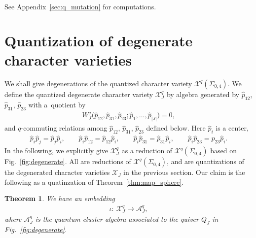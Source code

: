 \documentclass[pdftex]{sigma}
\numberwithin{equation}{section}
\newtheorem{Theorem}{Theorem}[section]
\begin{document}
See Appendix~\ref{sec:q_mutation} for computations.

\section{Quantization of degenerate character varieties}\label{sec:q_confluence}
We shall give degenerations of the quantized character variety $\mathcal{X}^q(\Sigma_{0,4})$. We define the quantized degenerate character variety $\mathcal{X}^q_J$ by algebra generated by $\hat{p}_{12}$, $\hat{p}_{31}$, $\hat{p}_{23}$ with a~quotient by
\begin{gather*} %
 W^q_J\big(\hat{p}_{12},\hat{p}_{31},\hat{p}_{23}; \hat{p}_1, \dots, \hat{p}_{|J|} \big) =0 ,
\end{gather*}
and $q$-commuting relations among $\hat{p}_{12}$, $\hat{p}_{31}$, $\hat{p}_{23}$ defined below. Here $\hat{p}_i$ is a center,
\begin{gather*} %
 \hat{p}_i \hat{p}_j = \hat{p}_j \hat{p}_i, \qquad \hat{p}_i \hat{p}_{12} = \hat{p}_{12} \hat{p}_{i} , \qquad \hat{p}_i \hat{p}_{31} = \hat{p}_{31} \hat{p}_{i} , \qquad \hat{p}_i \hat{p}_{23} = \hat{p}_{23} \hat{p}_{i} .
\end{gather*}
In the following, we explicitly give $\mathcal{X}^q_J$ as a reduction of $\mathcal{X}^q(\Sigma_{0,4})$ based on Fig.~\ref{fig:degenerate}. All are reductions of $\mathcal{X}^q(\Sigma_{0,4})$, and are quantizations of the degenerated character varieties $\mathcal{X}_J$ in the previous section. Our claim is the following as a quatinzation of Theorem~\ref{thm:map_sphere}.

\begin{Theorem} \label{thm:q_sphere} We have an embedding
 \begin{gather*}
 \iota\colon \ \mathcal{X}^q_J \to \mathcal{A}^q_J,
 \end{gather*}
 where $\mathcal{A}^q_J$ is the quantum cluster algebra associated to the quiver ${Q}_J$ in Fig.~{\rm \ref{fig:degenerate}}.
\end{Theorem}
\end{document}
